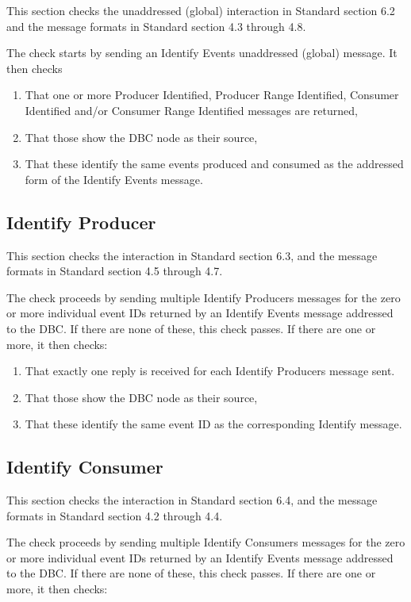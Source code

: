 \documentclass[11pt]{article}
\begin{document}
This section checks the unaddressed (global) interaction in Standard section 6.2 and
the message formats in Standard section 4.3 through 4.8.

The check starts by sending an Identify Events unaddressed (global) message.
It then checks

\begin{enumerate}
\item That one or more Producer Identified, Producer Range Identified, 
        Consumer Identified and/or Consumer Range Identified messages are returned,
\item That those show the DBC node as their source,
\item That these identify the same events produced and consumed as the 
        addressed form of the Identify Events message.
\end{enumerate}

\subsection{Identify Producer}

This section checks the interaction in Standard section 6.3, and
the message formats in Standard section 4.5 through 4.7.

The check proceeds by sending multiple Identify Producers messages for 
the zero or more individual event IDs returned by an Identify Events message 
addressed to the DBC. If there are none of these, this check passes. If there
are one or more, it then checks:

\begin{enumerate}
\item That exactly one reply is received for each Identify Producers message sent.
\item That those show the DBC node as their source,
\item That these identify the same event ID as the corresponding Identify message.
\end{enumerate}

\subsection{Identify Consumer}

This section checks the interaction in Standard section 6.4, and
the message formats in Standard section 4.2 through 4.4.

The check proceeds by sending multiple Identify Consumers messages for 
the zero or more individual event IDs returned by an Identify Events message 
addressed to the DBC. If there are none of these, this check passes. If there
are one or more, it then checks:
\end{document}
